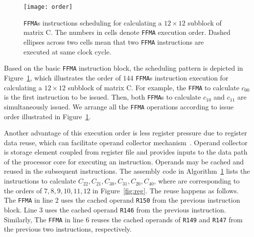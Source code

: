 \begin{figure}[htbp]
\begin{center}
\texttt{[image: order]}
\caption{{\tt FFMA}s instructions scheduling for calculating a $12\times 12$ subblock of matrix C.  The numbers in cells denote {\tt FFMA} execution order. Dashed ellipses across two cells mean that two {\tt FFMA} instructions are executed at same clock cycle.}
\label{fig:order}
\end{center}
\end{figure}

Based on the basic {\tt FFMA} instruction block, the scheduling pattern is depicted in Figure~\ref{fig:order}, which
illustrates the order of $144$ {\tt FFMA}s instruction execution for calculating a $12\times 12$ subblock of matrix C.
For example, the {\tt FFMA} to calculate $c_{00}$ is the first instruction to be issued. Then, both {\tt FFMA}s to
calculate $c_{10}$ and  $c_{11}$ are simultaneously issued. We arrange all the {\tt FFMA} operations according to issue
order illustrated in Figure~\ref{fig:order}.

Another advantage of this execution order is less register pressure due to register data reuse, which can facilitate
operand collector mechanism~\cite{collector}. Operand collector is storage element coupled from register file and
provides inputs to the data path of the processor core for executing an instruction. Operands may be cached and reused
in the subsequent instructions. The assembly code in Algorithm~\ref{fig:order} lists the instructions to calculate
$C_{22}, C_{21}, C_{30}, C_{31}, C_{20}, C_{40}$, where are corresponding to the orders of $7,8,9,10,11,12$ in
Figure~\ref{fig:reg}. The reuse happens as follows. The {\tt FFMA} in line 2 uses the cached operand {\tt R150} from the previous instruction block. Line 3 uses the cached operand {\tt R146} from the previous instruction. Similarly, The {\tt FFMA} in line 6 reuses the cached operands of   {\tt R149} and {\tt R147} from the previous two instructions, respectively.

